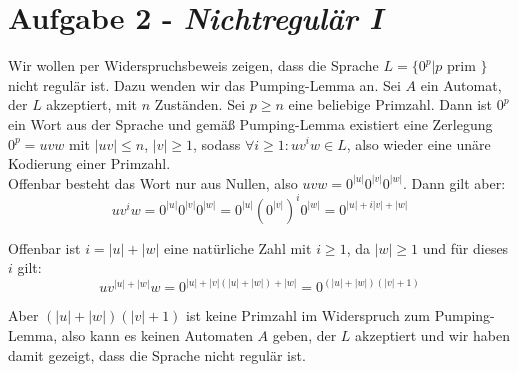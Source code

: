 \documentclass{article}
\begin{document}
\section*{Aufgabe 2 - \textit{Nichtregulär I}}

Wir wollen per Widerspruchsbeweis zeigen, dass die Sprache $L= \{0^p | p \text{ prim }\}$ nicht regulär ist. Dazu wenden wir das Pumping-Lemma an. Sei $A$ ein Automat, der $L$ akzeptiert, mit $n$ Zuständen. Sei $p \ge n$ eine beliebige Primzahl. Dann ist $0^p$ ein Wort aus der Sprache und gemäß Pumping-Lemma existiert eine Zerlegung $0^p = uvw$ mit $|uv| \le n $, $|v| \ge 1$, sodass $\forall i \ge 1 : uv^i w \in L$, also wieder eine unäre Kodierung einer Primzahl.\\


Offenbar besteht das Wort nur aus Nullen, also $uvw = 0^{|u|} 0^{|v|} 0^{|w|}$. Dann gilt aber:
\begin{equation}
	uv^i w = 0^{|u|} 0^{|v|} 0^{|w|} = 0^{|u|} (0^{|v|})^i 0^{|w|} = 0^{|u| + i|v| + |w|}
\end{equation}

Offenbar ist $i = |u| + |w|$ eine natürliche Zahl mit $i \ge 1$, da $|w| \ge 1$ und für dieses $i$ gilt:
\begin{equation}
	uv^{|u| + |w|} w = 0^{|u| + |v|(|u| + |w|) + |w|} = 0^{(|u| + |w|)(|v|+1)}
\end{equation}

Aber $(|u| + |w|)(|v|+1)$ ist keine Primzahl im Widerspruch zum Pumping-Lemma, also kann es keinen Automaten $A$ geben, der $L$ akzeptiert und wir haben damit gezeigt, dass die Sprache nicht regulär ist.
\end{document}
